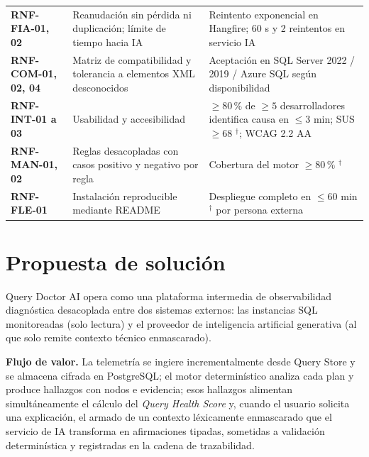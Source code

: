 \documentclass[12pt,a4paper]{article}
\newcommand{\dagsym}{\ensuremath{^{\dagger}}}
\begin{document}
\begin{longtable}{>{\bfseries}p{} p{} p{}}
RNF-FIA-01, 02 & Reanudación sin pérdida ni duplicación; límite de tiempo hacia IA & Reintento exponencial en Hangfire; 60 s y 2 reintentos en servicio IA \\
RNF-COM-01, 02, 04 & Matriz de compatibilidad y tolerancia a elementos XML desconocidos & Aceptación en SQL Server 2022 / 2019 / Azure SQL según disponibilidad \\
RNF-INT-01 a 03 & Usabilidad y accesibilidad & $\ge 80\,\%$ de $\ge 5$ desarrolladores identifica causa en $\le 3\text{ min}$; SUS $\ge 68$ \dagsym{}; WCAG 2.2 AA \cite{wcag-22} \\
RNF-MAN-01, 02 & Reglas desacopladas con casos positivo y negativo por regla & Cobertura del motor $\ge 80\,\%$ \dagsym{} \\
RNF-FLE-01 & Instalación reproducible mediante README & Despliegue completo en $\le 60\text{ min}$ \dagsym{} por persona externa \\
\end{longtable}
\endgroup

\section{Propuesta de solución}

Query Doctor AI opera como una plataforma intermedia de observabilidad diagnóstica desacoplada entre dos sistemas externos: las instancias SQL monitoreadas (solo lectura) y el proveedor de inteligencia artificial generativa (al que solo remite contexto técnico enmascarado).

\textbf{Flujo de valor.} La telemetría se ingiere incrementalmente desde Query Store y se almacena cifrada en PostgreSQL; el motor determinístico analiza cada plan y produce hallazgos con nodos e evidencia; esos hallazgos alimentan simultáneamente el cálculo del \textit{Query Health Score} y, cuando el usuario solicita una explicación, el armado de un contexto léxicamente enmascarado que el servicio de IA transforma en afirmaciones tipadas, sometidas a validación determinística y registradas en la cadena de trazabilidad.
\end{document}
